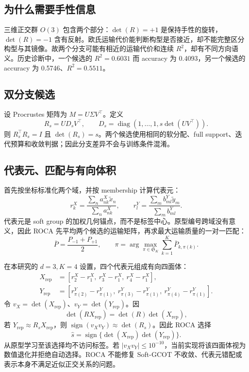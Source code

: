 \documentclass[UTF8,a4paper,11pt]{ctexart}
\begin{document}
\subsection{为什么需要手性信息}
三维正交群 $O(3)$ 包含两个部分：$\det(R)=+1$ 是保持手性的旋转，$\det(R)=-1$ 含有反射。欧氏运输代价能判断构型是否接近，却不能完整区分构型与其镜像。故两个分支可能有相近的运输代价和连续 $R^2$，却有不同方向语义。历史诊断中，一个候选的 $R^2=0.6031$ 而 accuracy 为 0.4093，另一个候选的 accuracy 为 0.5746、$R^2=0.5511$。

\subsection{双分支候选}
设 Procrustes 矩阵为 $M=U\Sigma V^\top$。定义
\begin{equation}
R_s=UD_sV^\top,\qquad
D_s=\operatorname{diag}(1,\ldots,1,s\det(UV^\top)).
\end{equation}
则 $R_s^\top R_s=I$ 且 $\det(R_s)=s$。两个候选使用相同的软分配、full support、迭代预算和收敛判据；因此分支差异不会与训练条件混淆。

\subsection{代表元、匹配与有向体积}
首先按坐标标准化两个域，并按 membership 计算代表元：
\begin{equation}
r_k^X=\frac{\sum_n a_{nk}^X\tilde x_n}{\sum_n a_{nk}^X},\qquad
r_l^Y=\frac{\sum_m b_{ml}^Y\tilde y_m}{\sum_m b_{ml}^Y}.
\end{equation}
代表元是 soft group 的加权几何锚点，而不是标签中心。原型编号跨域没有意义，因此 ROCA 先平均两个候选的运输矩阵，再求最大运输质量的一对一匹配：
\begin{equation}
\bar P=\frac{P_{-1}+P_{+1}}{2},\qquad
\pi=\arg\max_{\pi\in\mathfrak S_K}\sum_{k=1}^{K}\bar P_{k,\pi(k)}.
\end{equation}

在本研究的 $d=3,K=4$ 设置，四个代表元组成有向四面体：
\begin{align}
X_{\mathrm{rep}}&=[r_2^X-r_1^X,\ r_3^X-r_1^X,\ r_4^X-r_1^X],\\
Y_{\mathrm{rep}}&=[r_{\pi(2)}^Y-r_{\pi(1)}^Y,\ r_{\pi(3)}^Y-r_{\pi(1)}^Y,\ r_{\pi(4)}^Y-r_{\pi(1)}^Y].
\end{align}
令 $v_X=\det(X_{\mathrm{rep}})$、$v_Y=\det(Y_{\mathrm{rep}})$。因
\begin{equation}
\det(RX_{\mathrm{rep}})=\det(R)\det(X_{\mathrm{rep}}),
\end{equation}
若 $Y_{\mathrm{rep}}\approx R_sX_{\mathrm{rep}}$，则 $\operatorname{sign}(v_Xv_Y)\approx\det(R_s)$。因此 ROCA 选择
\begin{equation}
\boxed{\hat s=\operatorname{sign}\{\det(X_{\mathrm{rep}})\det(Y_{\mathrm{rep}})\}.}
\end{equation}
从原型学习至该选择均不访问标签。若 $|v_Xv_Y|\le10^{-10}$，当前实现将该四面体视为数值退化并拒绝自动选择。ROCA 不能修复 Soft-GCOT 不收敛、代表元错配或表示本身不满足近似正交关系的问题。
\end{document}
